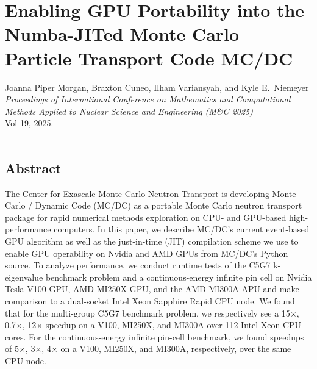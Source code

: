 \renewcommand{\TheTitle}{Enabling GPU Portability into the Numba-JITed Monte Carlo Particle Transport Code MC/DC}

\renewcommand{\TheAuthors}{%
  Joanna Piper Morgan,
  Braxton Cuneo,
  Ilham Variansyah, 
  and Kyle E.~Niemeyer}
  
\renewcommand{\TheAddress}{%
    \textit{Proceedings of International Conference on Mathematics and Computational Methods Applied to Nuclear Science and Engineering (M\&C 2025)} \\
    Vol 19, 2025. \\
    \doi{10.13182/MC25-47142}\\
    \arxiv{2501.05440}
}

\chapter{\TheTitle}
\label{chapter:mcdc_prof}

\vspace{1em}
\TheAuthors
\vspace{1em}
\TheAddress
\vspace{1em}



\section*{Abstract}%
The Center for Exascale Monte Carlo Neutron Transport is developing Monte Carlo / Dynamic Code (MC/DC) as a portable Monte Carlo neutron transport package for rapid numerical methods exploration on CPU- and GPU-based high-performance computers.
In this paper, we describe MC/DC's current event-based GPU algorithm as well as the just-in-time (JIT) compilation scheme we use to enable GPU operability on Nvidia and AMD GPUs from MC/DC's Python source.
To analyze performance, we conduct runtime tests of the C5G7 k-eigenvalue benchmark problem and a continuous-energy infinite pin cell on Nvidia Tesla V100 GPU, AMD MI250X GPU, and the AMD MI300A APU and make comparison to a dual-socket Intel Xeon Sapphire Rapid CPU node.
We found that for the multi-group C5G7 benchmark problem, we respectively see a 15$\times$, 0.7$\times$, 12$\times$ speedup on a V100, MI250X, and MI300A over 112 Intel Xeon CPU cores.
For the continuous-energy infinite pin-cell benchmark, we found speedups of 5$\times$, 3$\times$, 4$\times$ on a V100, MI250X, and MI300A, respectively, over the same CPU node.


